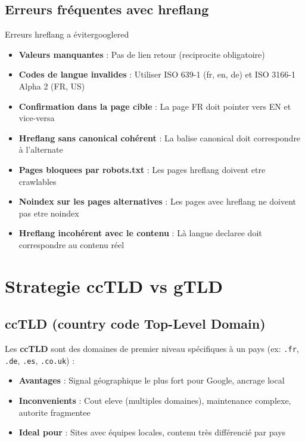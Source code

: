 \documentclass[12pt,a4paper,twoside]{report}
\newcommand{\keyword}[1]{\textbf{\textcolor{googleblue}{#1}}}
\begin{document}
\subsection{Erreurs fréquentes avec hreflang}

\begin{mybox}{Erreurs hreflang a éviter}{googlered}
\begin{itemize}
    \item \textbf{Valeurs manquantes} : Pas de lien retour (reciprocite obligatoire)
    \item \textbf{Codes de langue invalides} : Utiliser ISO 639-1 (fr, en, de) et ISO 3166-1 Alpha 2 (FR, US)
    \item \textbf{Confirmation dans la page cible} : La page FR doit pointer vers EN et vice-versa
    \item \textbf{Hreflang sans canonical cohérent} : La balise canonical doit correspondre à l'alternate
    \item \textbf{Pages bloquees par robots.txt} : Les pages hreflang doivent etre crawlables
    \item \textbf{Noindex sur les pages alternatives} : Les pages avec hreflang ne doivent pas etre noindex
    \item \textbf{Hreflang incohérent avec le contenu} : Là langue declaree doit correspondre au contenu réel
\end{itemize}
\end{mybox}

\section{Strategie ccTLD vs gTLD}

\subsection{ccTLD (country code Top-Level Domain)}

Les \keyword{ccTLD} sont des domaines de premier niveau spécifiques à un pays (ex: \texttt{.fr}, \texttt{.de}, \texttt{.es}, \texttt{.co.uk}) :

\begin{itemize}
    \item \textbf{Avantages} : Signal géographique le plus fort pour Google, ancrage local
    \item \textbf{Inconvenients} : Cout eleve (multiples domaines), maintenance complexe, autorite fragmentee
    \item \textbf{Ideal pour} : Sites avec équipes locales, contenu très différencié par pays
\end{itemize}
\end{document}
